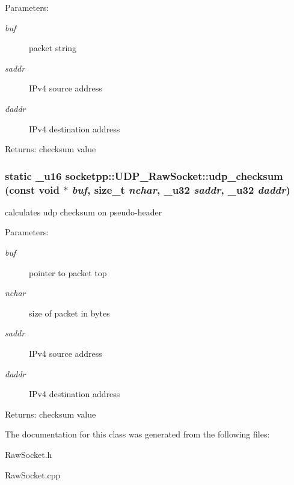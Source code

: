\begin{Desc}
\item[Parameters:]
\begin{description}
\item[{\em buf}]packet string \item[{\em saddr}]IPv4 source address \item[{\em daddr}]IPv4 destination address \end{description}
\end{Desc}
\begin{Desc}
\item[Returns:]checksum value \end{Desc}
\hypertarget{classsocketpp_1_1UDP__RawSocket_8e32b5a6458da2a8660b6353a1c7ad9b}{
\subsubsection[{udp\_\-checksum}]{\setlength{\rightskip}{0pt plus 5cm}static \_\-u16 socketpp::UDP\_\-RawSocket::udp\_\-checksum (const void $\ast$ {\em buf}, \/  size\_\-t {\em nchar}, \/  \_\-u32 {\em saddr}, \/  \_\-u32 {\em daddr})}}
\label{classsocketpp_1_1UDP__RawSocket_8e32b5a6458da2a8660b6353a1c7ad9b}


calculates udp checksum on pseudo-header 

\begin{Desc}
\item[Parameters:]
\begin{description}
\item[{\em buf}]pointer to packet top \item[{\em nchar}]size of packet in bytes \item[{\em saddr}]IPv4 source address \item[{\em daddr}]IPv4 destination address \end{description}
\end{Desc}
\begin{Desc}
\item[Returns:]checksum value \end{Desc}


The documentation for this class was generated from the following files:\begin{CompactItemize}
\item 
RawSocket.h\item 
RawSocket.cpp\end{CompactItemize}
